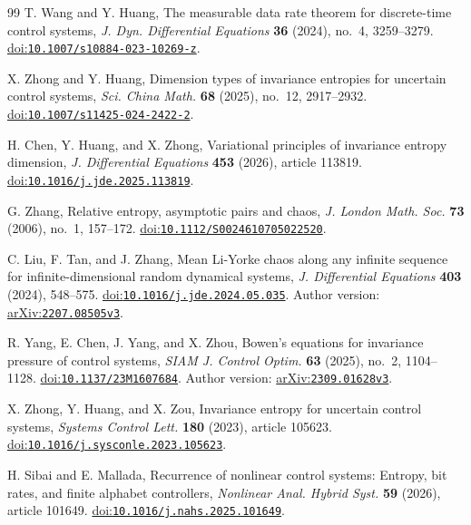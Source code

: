 \documentclass[11pt,a4paper]{article}
\theoremstyle{definition}
\theoremstyle{remark}
\begin{document}
\begin{thebibliography}{99}
T. Wang and Y. Huang, The measurable data rate theorem for discrete-time control systems,
\emph{J. Dyn. Differential Equations} \textbf{36} (2024), no.~4, 3259--3279.
\href{https://doi.org/10.1007/s10884-023-10269-z}{doi:\nolinkurl{10.1007/s10884-023-10269-z}}.

X. Zhong and Y. Huang, Dimension types of invariance entropies for uncertain control systems,
\emph{Sci. China Math.} \textbf{68} (2025), no.~12, 2917--2932.
\href{https://doi.org/10.1007/s11425-024-2422-2}{doi:\nolinkurl{10.1007/s11425-024-2422-2}}.

H. Chen, Y. Huang, and X. Zhong, Variational principles of invariance entropy dimension,
\emph{J. Differential Equations} \textbf{453} (2026), article 113819.
\href{https://doi.org/10.1016/j.jde.2025.113819}{doi:\nolinkurl{10.1016/j.jde.2025.113819}}.

G. Zhang, Relative entropy, asymptotic pairs and chaos,
\emph{J. London Math. Soc.} \textbf{73} (2006), no.~1, 157--172.
\href{https://doi.org/10.1112/S0024610705022520}{doi:\nolinkurl{10.1112/S0024610705022520}}.

C. Liu, F. Tan, and J. Zhang,
Mean Li-Yorke chaos along any infinite sequence for infinite-dimensional random dynamical systems,
\emph{J. Differential Equations} \textbf{403} (2024), 548--575.
\href{https://doi.org/10.1016/j.jde.2024.05.035}{doi:\nolinkurl{10.1016/j.jde.2024.05.035}}. Author version: \href{https://arxiv.org/abs/2207.08505v3}{arXiv:\nolinkurl{2207.08505v3}}.

R. Yang, E. Chen, J. Yang, and X. Zhou,
Bowen's equations for invariance pressure of control systems,
\emph{SIAM J. Control Optim.} \textbf{63} (2025), no.~2, 1104--1128.
\href{https://doi.org/10.1137/23M1607684}{doi:\nolinkurl{10.1137/23M1607684}}. Author version: \href{https://arxiv.org/abs/2309.01628v3}{arXiv:\nolinkurl{2309.01628v3}}.

X. Zhong, Y. Huang, and X. Zou,
Invariance entropy for uncertain control systems,
\emph{Systems Control Lett.} \textbf{180} (2023), article 105623.
\href{https://doi.org/10.1016/j.sysconle.2023.105623}{doi:\nolinkurl{10.1016/j.sysconle.2023.105623}}.

H. Sibai and E. Mallada,
Recurrence of nonlinear control systems: Entropy, bit rates, and finite alphabet controllers,
\emph{Nonlinear Anal. Hybrid Syst.} \textbf{59} (2026), article 101649.
\href{https://doi.org/10.1016/j.nahs.2025.101649}{doi:\nolinkurl{10.1016/j.nahs.2025.101649}}.


\end{thebibliography}
\end{document}
